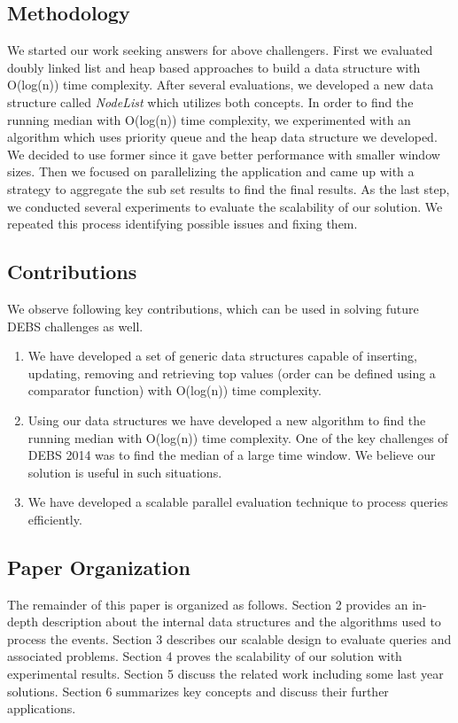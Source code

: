 \subsection{Methodology}

We started our work seeking answers for above challengers. First we evaluated doubly linked list and heap based approaches to build a data structure with O(log(n)) time complexity. After several evaluations, we developed a new data structure called \textit{NodeList} which utilizes both concepts. In order to find the running median with O(log(n)) time complexity, we experimented with an algorithm which uses priority queue and the heap data structure we developed. We decided to use former since it gave better performance with smaller window sizes. Then we focused on parallelizing the application and came up with a strategy to aggregate the sub set results to find the final results. As the last step, we conducted several experiments to evaluate the scalability of our solution. We repeated this process identifying possible issues and fixing them.


\subsection{Contributions}
We observe following key contributions, which can be used in solving future DEBS challenges as well.
\begin{enumerate}
	\item We have developed a set of  generic data structures capable of inserting, updating, removing and retrieving top values (order can be defined using a comparator function) with O(log(n)) time complexity. 
	\item Using our data structures we have developed a new algorithm to find the running median with O(log(n)) time complexity. One of the key challenges of DEBS 2014 \cite{jerzak2014debs}  was to find the median of a large time window. We believe our solution is useful in such situations.
	\item We have developed a scalable parallel evaluation technique to process queries efficiently. 
\end{enumerate}

\subsection{Paper Organization}
The remainder of this paper is organized as follows. Section 2 provides an in-depth description about the internal data structures and the algorithms used to process the events. Section 3 describes our scalable design to evaluate queries and associated problems. Section 4 proves the scalability of our solution with experimental results. Section 5 discuss the related work including some last year solutions. Section 6 summarizes key concepts and discuss their further applications. 
